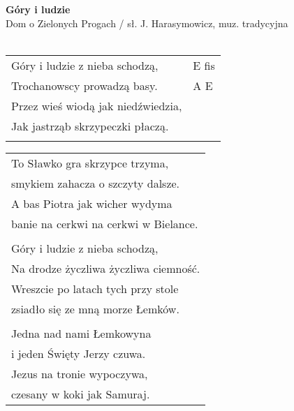 \documentclass[a5paper]{article}
\begin{document}


\noindent
\fontsize{12pt}{15pt}\selectfont
\textbf{Góry i ludzie} \\
\fontsize{8pt}{10pt}\selectfont
Dom o Zielonych Progach / sł. J. Harasymowicz, muz. tradycyjna \\ \\
\fontsize{10pt}{12pt}\selectfont
{}
\begin{tabular}{@{}p{7.50cm}p{3cm}@{}}
\noindent
Góry i ludzie z nieba schodzą, & E fis \\
Trochanowscy prowadzą basy. & A E \\
Przez wieś wiodą jak niedźwiedzia, & \\
Jak jastrząb skrzypeczki płaczą. & \\ \\
\end{tabular}

\noindent
\begin{tabular}{@{}p{7.50cm}@{}}
To Sławko gra skrzypce trzyma, \\
smykiem zahacza o szczyty dalsze. \\
A bas Piotra jak wicher wydyma \\
banie na cerkwi na cerkwi w Bielance. \\ \\

Góry i ludzie z nieba schodzą, \\
Na drodze życzliwa życzliwa ciemność. \\
Wreszcie po latach tych przy stole \\
zsiadło się ze mną morze Łemków. \\ \\

Jedna nad nami Łemkowyna \\
i jeden Święty Jerzy czuwa. \\ 
Jezus na tronie wypoczywa, \\
czesany w koki jak Samuraj.
\end{tabular}
\end{document}
